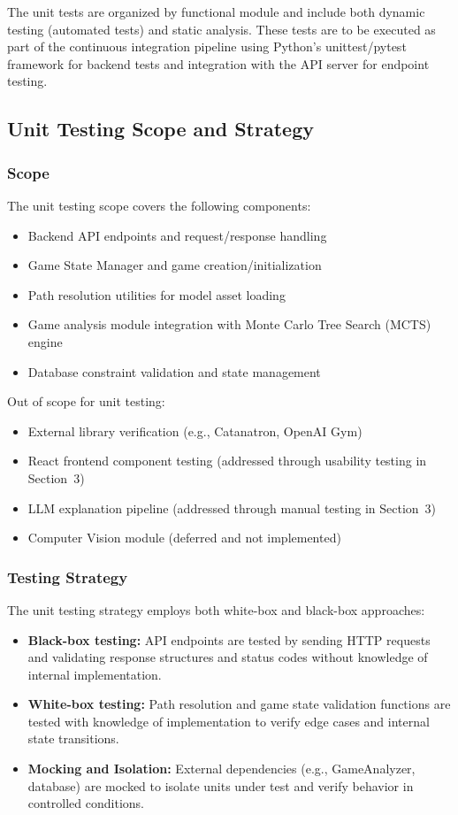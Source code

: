 \documentclass[12pt, titlepage]{article}
\begin{document}
The unit tests are organized by functional module and include both dynamic testing (automated tests) and static analysis. These tests are to be executed as part of the continuous integration pipeline using Python's unittest/pytest framework for backend tests and integration with the API server for endpoint testing.

\subsection{Unit Testing Scope and Strategy}

\subsubsection{Scope}

The unit testing scope covers the following components:
\begin{itemize}
    \item Backend API endpoints and request/response handling
    \item Game State Manager and game creation/initialization
    \item Path resolution utilities for model asset loading
    \item Game analysis module integration with Monte Carlo Tree Search (MCTS) engine
    \item Database constraint validation and state management
\end{itemize}

Out of scope for unit testing:
\begin{itemize}
    \item External library verification (e.g., Catanatron, OpenAI Gym)
    \item React frontend component testing (addressed through usability testing in Section~3)
    \item LLM explanation pipeline (addressed through manual testing in Section~3)
    \item Computer Vision module (deferred and not implemented)
\end{itemize}

\subsubsection{Testing Strategy}

The unit testing strategy employs both white-box and black-box approaches:
\begin{itemize}
    \item \textbf{Black-box testing:} API endpoints are tested by sending HTTP requests and validating response structures and status codes without knowledge of internal implementation.
    \item \textbf{White-box testing:} Path resolution and game state validation functions are tested with knowledge of implementation to verify edge cases and internal state transitions.
    \item \textbf{Mocking and Isolation:} External dependencies (e.g., GameAnalyzer, database) are mocked to isolate units under test and verify behavior in controlled conditions.
\end{itemize}
\end{document}
